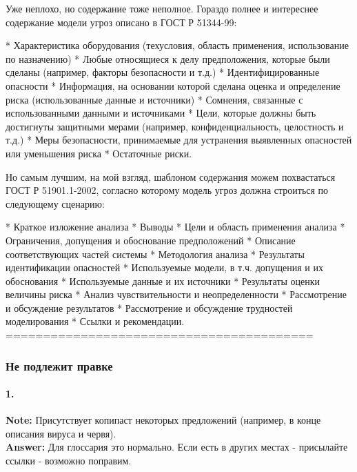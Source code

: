 Уже неплохо, но содержание тоже неполное. Гораздо полнее и интереснее содержание модели угроз описано в ГОСТ Р 51344-99:

    * Характеристика оборудования (техусловия, область применения, использование по назначению)
    * Любые относящиеся к делу предположения, которые были сделаны (например, факторы безопасности и т.д.)
    * Идентифицированные опасности
    * Информация, на основании которой сделана оценка и определение риска (использованные данные и источники)
    * Сомнения, связанные с использованными данными и источниками
    * Цели, которые должны быть достигнуты защитными мерами (например, конфиденциальность, целостность и т.д.)
    * Меры безопасности, принимаемые для устранения выявленных опасностей или уменьшения риска
    * Остаточные риски.


Но самым лучшим, на мой взгляд, шаблоном содержания можем похвастаться ГОСТ Р 51901.1-2002, согласно которому модель угроз должна строиться по следующему сценарию:

    * Краткое изложение анализа
    * Выводы
    * Цели и область применения анализа
    * Ограничения, допущения и обоснование предположений
    * Описание соответствующих частей системы
    * Методология анализа
    * Результаты идентификации опасностей
    * Используемые модели, в т.ч. допущения и их обоснования
    * Используемые данные и их источники
    * Результаты оценки величины риска
    * Анализ чувствительности и неопределенности
    * Рассмотрение и обсуждение результатов
    * Рассмотрение и обсуждение трудностей моделирования
    * Ссылки и рекомендации.\\

=========================================\\





\subsubsection{Не подлежит правке}
\label{wonnt_fix}
\paragraph{1.\\}
{\bf Note:} Присутствует копипаст некоторых предложений (например, в конце описания вируса и червя).\\
{\bf Answer:} Для глоссария это нормально. Если есть в других местах - присылайте ссылки - возможно поправим.

